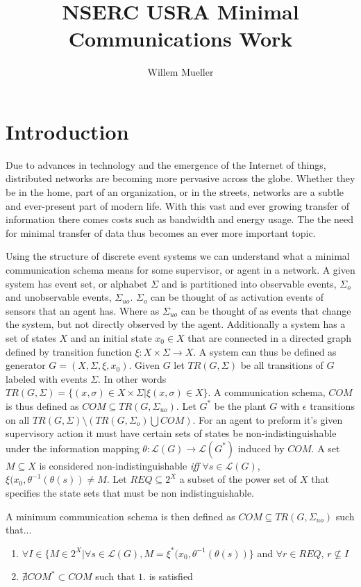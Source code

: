 \documentclass{article}
\title{NSERC USRA Minimal Communications Work}
\author{Willem Mueller}
\begin{document}
	\maketitle

	\section{Introduction}

		Due to advances in technology and the emergence of the Internet of things, distributed networks are becoming more pervasive across the globe. Whether they be in the home, part of an organization, or in the streets, networks are a subtle and ever-present part of modern life. With this vast and ever growing transfer of information there comes costs such as bandwidth and energy usage. The the need for minimal transfer of data thus becomes an ever more important topic. 

		Using the structure of discrete event systems we can understand what a minimal communication schema means for some supervisor, or agent in a network. A given system has event set, or alphabet $\Sigma$ and is partitioned into observable events, $\Sigma_o$ and unobservable events, $\Sigma_{uo}$. $\Sigma_o$ can be thought of as activation events of sensors that an agent has. Where as $\Sigma_{uo}$ can be thought of as events that change the system, but not directly observed by the agent. Additionally a system has a set of states $X$ and an initial state $x_0 \in X$ that are connected in a directed graph defined by transition function $\xi : X \times \Sigma \to X$. A system can thus be defined as generator $G = (X, \Sigma, \xi, x_0)$. Given $G$ let $TR(G,\Sigma)$ be all transitions of $G$ labeled with events $\Sigma$. In other words $TR(G,\Sigma) = \{(x, \sigma)\in X\times\Sigma | \xi(x, \sigma) \in X\}$. A communication schema, $COM$ is thus defined as $COM \subseteq TR(G, \Sigma_{uo})$. Let $G^*$ be the plant $G$ with $\epsilon$ transitions on all $TR(G, \Sigma)\setminus (TR(G, \Sigma_o) \bigcup COM)$. For an agent to preform it's given supervisory action it must have certain sets of states be non-indistinguishable under the information mapping $\theta : \mathcal{L}(G) \to \mathcal{L}(G^*)$ induced by $COM$. A set $M\subseteq X$ is considered non-indistinguishable \emph{iff} $\forall s \in \mathcal{L}(G)$, $\xi(x_0, \theta^{-1}(\theta(s)) \neq M$. Let $REQ \subseteq 2^X$ a subset of the power set of $X$ that specifies the state sets that must be non indistinguishable. 

		A minimum communication schema is then defined as $COM \subseteq TR(G, \Sigma_{uo})$ such that...
		\begin{enumerate}
			\item $\forall I\in\{M \in 2^X | \forall s \in \mathcal{L}(G), M = \xi^*(x_0, \theta^{-1}(\theta(s))\} $ and $ \forall r\in REQ$, $ r\nsubseteq I$
			\item $\nexists COM^* \subset COM$ such that $1.$ is satisfied
		\end{enumerate}
\end{document}
